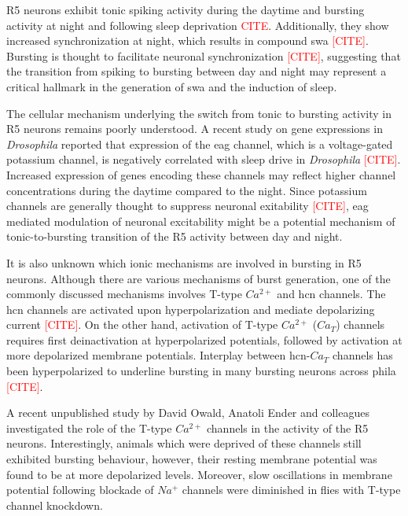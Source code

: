 \documentclass[../main.tex]{subfiles}
\begin{document}
R5 neurons exhibit tonic spiking activity during the daytime and bursting activity at night and following sleep deprivation \textcolor{red}{CITE}. Additionally, they show increased synchronization at night, which results in compound \gls{swa} \textcolor{red}{[CITE]}. Bursting is thought to facilitate neuronal synchronization \textcolor{red}{[CITE]}, suggesting that the transition from spiking to bursting between day and night may represent a critical hallmark in the generation of \gls{swa} and the induction of sleep.

The cellular mechanism underlying the switch from tonic to bursting activity in R5 neurons remains poorly understood. A recent study on gene expressions in \textit{Drosophila} reported that expression of the \gls{eag} channel, which is a voltage-gated potassium channel, is negatively correlated with sleep drive in \textit{Drosophila} \textcolor{red}{[CITE]}.
Increased expression of genes encoding these channels may reflect higher channel concentrations during the daytime compared to the night. Since potassium channels are generally thought to suppress neuronal exitability \textcolor{red}{[CITE]}, \gls{eag} mediated modulation of neuronal excitability might be a potential mechanism of tonic-to-bursting transition of the R5 activity between day and night.

It is also unknown which ionic mechanisms are involved in bursting in R5 neurons. Although there are various mechanisms of burst generation, one of the commonly discussed mechanisms involves T-type $Ca^{2+}$ and \gls{hcn} channels. The \gls{hcn} channels are activated upon hyperpolarization and mediate depolarizing current \textcolor{red}{[CITE]}. On the other hand, activation of T-type $Ca^{2+}$ ($Ca_T$) channels requires first deinactivation at hyperpolarized potentials, followed by activation at more depolarized membrane potentials. Interplay between \gls{hcn}-$Ca_T$ channels has been hyperpolarized to underline bursting in many bursting neurons across phila \textcolor{red}{[CITE]}.

A recent unpublished study by David Owald, Anatoli Ender and colleagues investigated the role of the T-type $Ca^{2+}$ channels in the activity of the R5 neurons. Interestingly, animals which were deprived of these channels still exhibited bursting behaviour, however, their resting membrane potential was found to be at more depolarized levels. Moreover, slow oscillations in membrane potential following blockade of $Na^+$ channels were diminished in flies with T-type channel knockdown.
\end{document}
